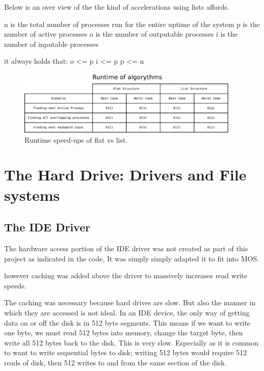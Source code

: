 \documentclass[a4paper]{report}
\begin{document}
Below is an over view of the the kind of accelerations using lists affords.

n is the total number of processes run for the entire uptime of the system
p is the number of active processes
o is the number of outputable processes
i is the number of inputable processes

it always holds that:
o <= p
i <= p
p <= n


\begin{figure}[ht]
\centering
\includegraphics[width=400px]{images/List_Speedup}
\caption{Runtime speed-ups of flat vs list.}
\label{fig:WinTitleBarScreen}
\end{figure}













\clearpage

\section{The Hard Drive: Drivers and File systems}

\subsection{The IDE Driver}

The hardware access portion of the IDE driver was not created as part of this project as indicated in the code, It was simply simply adapted it to fit into MOS.

however caching was added above the driver to massively increases read write speeds.

The caching was necessary because hard drives are slow. But also the manner in which they are accessed is not ideal. In an IDE device, the only way of getting data on or off the disk is in 512 byte segments. This means if we want to write one byte, we must read 512 bytes into memory, change the target byte, then write all 512 bytes back to the disk. This is very slow. Especially as it is common to want to write sequential bytes to disk; writing 512 bytes would require 512 reads of disk, then 512 writes to and from the same section of the disk.
\end{document}
